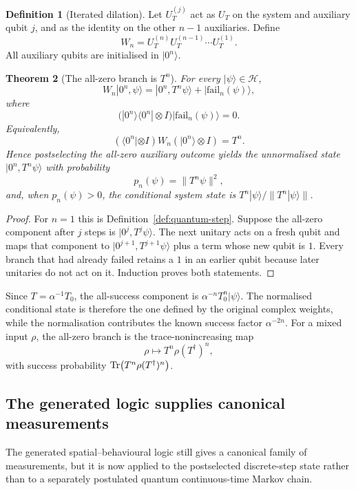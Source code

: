 \documentclass[11pt,a4paper]{article}
\theoremstyle{plain}
\newtheorem{theorem}{Theorem}
\theoremstyle{definition}
\newtheorem{definition}[theorem]{Definition}
\theoremstyle{remark}
\begin{document}
\begin{definition}[Iterated dilation]
\label{def:iterated-dilation}
Let $U_T^{(j)}$ act as $U_T$ on the system and auxiliary qubit $j$, and as the identity on the other
$n-1$ auxiliaries. Define
\[
W_n=U_T^{(n)}U_T^{(n-1)}\cdots U_T^{(1)}.
\]
All auxiliary qubits are initialised in $|0^n\rangle$.
\end{definition}

\begin{theorem}[The all-zero branch is $T^n$]
\label{thm:postselected-power}
For every $|\psi\rangle\in\mathcal{H}$,
\[
W_n|0^n,\psi\rangle
 =
|0^n,T^n\psi\rangle+|\mathrm{fail}_n(\psi)\rangle,
\]
where
\[
\big(|0^n\rangle\langle 0^n|\otimes I\big)
|\mathrm{fail}_n(\psi)\rangle=0.
\]
Equivalently,
\[
(\langle 0^n|\otimes I)W_n(|0^n\rangle\otimes I)=T^n.
\]
Hence postselecting the all-zero auxiliary outcome yields the unnormalised state
$|0^n,T^n\psi\rangle$ with probability
\[
p_n(\psi)=\|T^n\psi\|^2,
\]
and, when $p_n(\psi)>0$, the conditional system state is
$T^n|\psi\rangle/\|T^n|\psi\rangle\|$.
\end{theorem}

\begin{proof}
For $n=1$ this is Definition~\ref{def:quantum-step}. Suppose the all-zero component after $j$ steps
is $|0^j,T^j\psi\rangle$. The next unitary acts on a fresh qubit and maps that component to
$|0^{j+1},T^{j+1}\psi\rangle$ plus a term whose new qubit is $1$. Every branch that had already
failed retains a $1$ in an earlier qubit because later unitaries do not act on it. Induction proves
both statements.
\end{proof}

Since $T=\alpha^{-1}T_0$, the all-success component is
$\alpha^{-n}T_0^n|\psi\rangle$. The normalised conditional state is therefore the one defined by the
original complex weights, while the normalisation contributes the known success factor
$\alpha^{-2n}$. For a mixed input $\rho$, the all-zero branch is the trace-nonincreasing map
\[
\rho\longmapsto T^n\rho(T^\dagger)^n,
\]
with success probability ${\rm Tr}\big(T^n\rho(T^\dagger)^n\big)$.

\subsection{The generated logic supplies canonical measurements}
\label{sec:quantum-logic}

The generated spatial--behavioural logic still gives a canonical family of measurements, but it is
now applied to the postselected discrete-step state rather than to a separately postulated quantum
continuous-time Markov chain.
\end{document}
